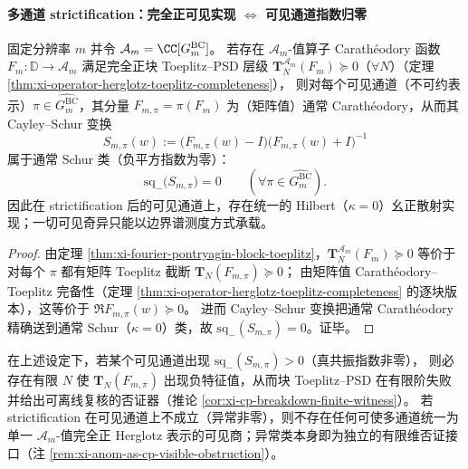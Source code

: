 \paragraph{多通道 strictification：完全正可见实现 \texorpdfstring{$\Longleftrightarrow$}{<->} 可见通道指数归零}
\begin{theorem}[完全正可见实现 \texorpdfstring{$\Rightarrow$}{=>} 可见通道负平方指数为零]\label{thm:xi-cp-visible-implies-kappa0}
固定分辨率 \(m\) 并令 \(\mathcal{A}_m=\CC[G^{\mathrm{BC}}_m]\)。
若存在 \(\mathcal{A}_m\)-值算子 Carath\'eodory 函数 \(F_m:\mathbb{D}\to\mathcal{A}_m\) 满足完全正块 Toeplitz--PSD 层级
\(\mathbf{T}^{\mathcal{A}_m}_N(F_m)\succeq 0\)（\(\forall N\)）（定理 \ref{thm:xi-operator-herglotz-toeplitz-completeness}），
则对每个可见通道（不可约表示）\(\pi\in\widehat{G^{\mathrm{BC}}_m}\)，其分量 \(F_{m,\pi}=\pi(F_m)\) 为（矩阵值）通常 Carath\'eodory，从而其 Cayley--Schur 变换
\[
S_{m,\pi}(w):=\bigl(F_{m,\pi}(w)-I\bigr)\bigl(F_{m,\pi}(w)+I\bigr)^{-1}
\]
属于通常 Schur 类（负平方指数为零）：
\[
\boxed{\;\mathrm{sq}_-\!\bigl(S_{m,\pi}\bigr)=0\qquad(\forall \pi\in\widehat{G^{\mathrm{BC}}_m}).\;}
\]
因此在 strictification 后的可见通道上，存在统一的 Hilbert（\(\kappa=0\)）幺正散射实现；一切可见奇异只能以边界谱测度方式承载。
\end{theorem}

\begin{proof}
由定理 \ref{thm:xi-fourier-pontryagin-block-toeplitz}，\(\mathbf{T}^{\mathcal{A}_m}_N(F_m)\succeq 0\) 等价于对每个 \(\pi\) 都有矩阵 Toeplitz 截断 \(\mathbf{T}_N(F_{m,\pi})\succeq 0\)；
由矩阵值 Carath\'eodory--Toeplitz 完备性（定理 \ref{thm:xi-operator-herglotz-toeplitz-completeness} 的逐块版本），这等价于 \(\Re F_{m,\pi}(w)\succeq 0\)。
进而 Cayley--Schur 变换把通常 Carath\'eodory 精确送到通常 Schur（\(\kappa=0\)）类，故 \(\mathrm{sq}_-(S_{m,\pi})=0\)。证毕。
\end{proof}

\begin{corollary}[真共振或 strictification 失败 \texorpdfstring{$\Rightarrow$}{=>} 有限维否证器]\label{cor:xi-multichannel-witness-kappa-or-anom}
在上述设定下，若某个可见通道出现 \(\mathrm{sq}_-(S_{m,\pi})>0\)（真共振指数非零），
则必存在有限 \(N\) 使 \(\mathbf{T}_N(F_{m,\pi})\) 出现负特征值，从而块 Toeplitz--PSD 在有限阶失败并给出可离线复核的否证器（推论 \ref{cor:xi-cp-breakdown-finite-witness}）。
若 strictification 在可见通道上不成立（异常非零），则不存在任何可使多通道统一为单一 \(\mathcal{A}_m\)-值完全正 Herglotz 表示的可见商；异常类本身即为独立的有限维否证接口（注 \ref{rem:xi-anom-as-cp-visible-obstruction}）。
\end{corollary}

